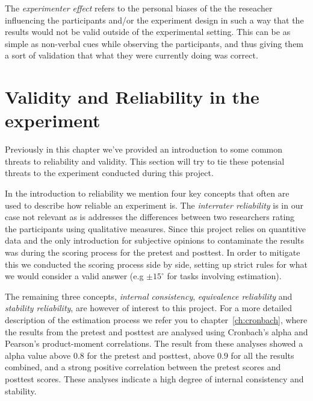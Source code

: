 	\bigskip\noindent
	The \textit{experimenter effect} refers to the personal biases of the the reseacher influencing the participants and/or the experiment design in such a way that the results would not be valid outside of the experimental setting. This can be as simple as non-verbal cues while observing the participants, and thus giving them a sort of validation that what they were currently doing was correct. 
	
	
\section{Validity and Reliability in the experiment}
	Previously in this chapter we've provided an introduction to some common threats to reliability and validity. This section will try to tie these potensial threats to the experiment conducted during this project. 
	
	\bigskip\noindent
	In the introduction to reliability we mention four key concepts that often are used to describe how reliable an experiment is. The \textit{interrater reliability} is in our case not relevant as is addresses the differences between two researchers rating the participants using qualitative measures. Since this project relies on quantitive data and the only introduction for subjective opinions to contaminate the results was during the scoring process for the pretest and posttest. In order to mitigate this we conducted the scoring process side by side, setting up strict rules for what we would consider a valid answer (e.g $\pm 15^{\circ}$ for tasks involving estimation).
	
	\bigskip\noindent
	The remaining three concepts, \textit{internal consistency}, \textit{equivalence reliability} and \textit{stability reliability}, are however of interest to this project. 
	For a more detailed description of the estimation process we refer you to chapter~\ref{ch:cronbach}, where the results from the pretest and posttest are analysed using Cronbach's alpha and Pearson's product-moment correlations. The result from these analyses showed a alpha value above $0.8$ for the pretest and posttest, above $0.9$ for all the results combined, and a strong positive correlation between the pretest scores and posttest scores. These analyses indicate a high degree of internal consistency and stability.